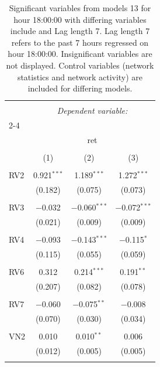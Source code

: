 
\begin{table}[!htbp] \centering 
  \caption{Significant variables from models 13 for hour 18:00:00 with differing variables include 
                               and Lag length 7. Lag length 7 refers to the past 7 hours regressed on hour 18:00:00. 
                               Insignificant variables are not displayed. 
                               Control variables (network statistics and network activity) are 
                               included for differing models.} 
  \label{RVmodels2_t_hourlagged5} 
\scriptsize 
\begin{tabular}{@{\extracolsep{5pt}}lccc} 
\\[-1.8ex]\hline 
\hline \\[-1.8ex] 
 & \multicolumn{3}{c}{\textit{Dependent variable:}} \\ 
\cline{2-4} 
\\[-1.8ex] & \multicolumn{3}{c}{ret} \\ 
\\[-1.8ex] & (1) & (2) & (3)\\ 
\hline \\[-1.8ex] 
 RV2 & 0.921$^{***}$ & 1.189$^{***}$ & 1.272$^{***}$ \\ 
  & (0.182) & (0.075) & (0.073) \\ 
  & & & \\ 
 RV3 & $-$0.032 & $-$0.060$^{***}$ & $-$0.072$^{***}$ \\ 
  & (0.021) & (0.009) & (0.009) \\ 
  & & & \\ 
 RV4 & $-$0.093 & $-$0.143$^{***}$ & $-$0.115$^{*}$ \\ 
  & (0.115) & (0.055) & (0.059) \\ 
  & & & \\ 
 RV6 & 0.312 & 0.214$^{***}$ & 0.191$^{**}$ \\ 
  & (0.207) & (0.082) & (0.078) \\ 
  & & & \\ 
 RV7 & $-$0.060 & $-$0.075$^{**}$ & $-$0.008 \\ 
  & (0.070) & (0.030) & (0.034) \\ 
  & & & \\ 
 VN2 & 0.010 & 0.010$^{**}$ & 0.006 \\ 
  & (0.012) & (0.005) & (0.005) \\ 
  & & & \\ 

\end{tabular}
\end{table}
